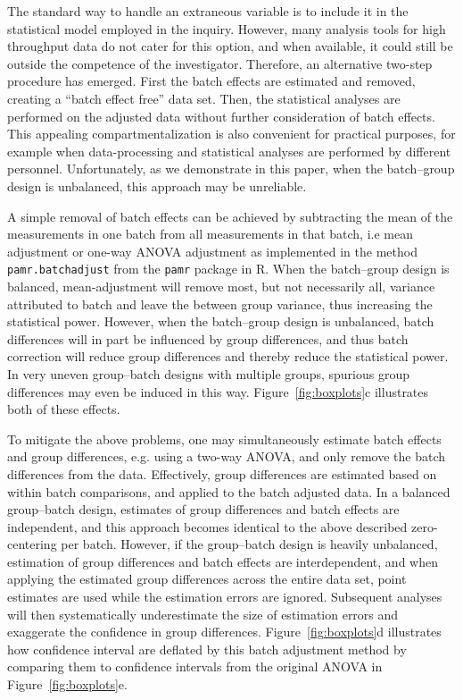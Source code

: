 \documentclass{bio}
\begin{document}
The standard way to handle an extraneous variable is to include it in the statistical model employed in the inquiry. However, many analysis tools for high throughput data do not cater for this option, and when available, it could still be outside the competence of the investigator. Therefore, an alternative two-step procedure has emerged. First the batch effects are estimated and removed, creating a ``batch effect free'' data set. Then, the statistical analyses are performed on the adjusted data without further consideration of batch effects. This appealing compartmentalization is also convenient for practical purposes, for example when data-processing and statistical analyses are performed by different personnel. Unfortunately, as we demonstrate in this paper, when the batch--group design is unbalanced, this approach may be unreliable.

A simple removal of batch effects can be achieved by subtracting the mean of the measurements in one batch from all measurements in that batch, i.e mean adjustment or one-way ANOVA adjustment as implemented in the method \texttt{pamr.batchadjust} from the \texttt{pamr} package in R. When the batch--group design is balanced, mean-adjustment will remove most, but not necessarily all, variance attributed to batch and leave the between group variance, thus increasing the statistical power. However, when the batch--group design is unbalanced, batch differences will in part be influenced by group differences, and thus batch correction will reduce group differences and thereby reduce the statistical power. In very uneven group--batch designs with multiple groups, spurious group differences may even be induced in this way. Figure~\ref{fig:boxplots}c illustrates both of these effects.

To mitigate the above problems, one may simultaneously estimate batch effects and group differences, e.g. using a two-way ANOVA, and only remove the batch differences from the data. Effectively, group differences are estimated based on within batch comparisons, and applied to the batch adjusted data. In a balanced group--batch design, estimates of group differences and batch effects are independent, and this approach becomes identical to the above described zero-centering per batch. However, if the group--batch design is heavily unbalanced, estimation of group differences and batch effects are interdependent, and when applying the estimated group differences across the entire data set, point estimates are used while the estimation errors are ignored. Subsequent analyses will then systematically underestimate the size of estimation errors and exaggerate the confidence in group differences. Figure~\ref{fig:boxplots}d illustrates how confidence interval are deflated by this batch adjustment method by comparing them to confidence intervals from the original ANOVA in Figure~\ref{fig:boxplots}e.
\end{document}
